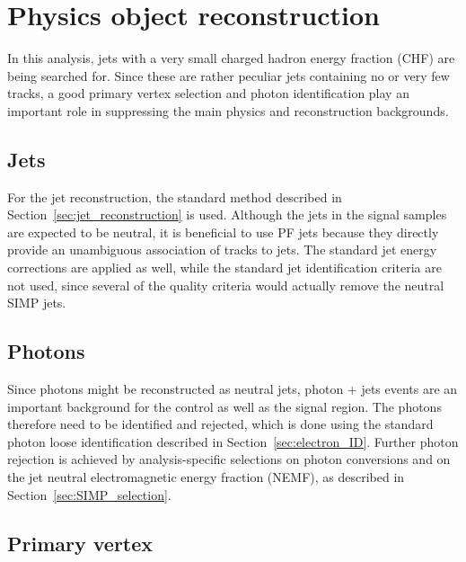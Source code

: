 \section{Physics object reconstruction} 
\label{sec:SIMP_reconstruction}

In this analysis, jets with a very small charged hadron energy fraction (CHF) are being searched for. Since these are rather peculiar jets containing no or very few tracks, a good primary vertex selection and photon identification play an important role in suppressing the main physics and reconstruction backgrounds.

\subsection{Jets}

For the jet reconstruction, the standard method described in Section~\ref{sec:jet_reconstruction} is used. Although the jets in the signal samples are expected to be neutral, it is beneficial to use \ac{PF} jets because they directly provide an unambiguous association of tracks to jets. The standard jet energy corrections are applied as well, while the standard jet identification criteria are not used, since several of the quality criteria would actually remove the neutral \ac{SIMP} jets.

\subsection{Photons}

Since photons might be reconstructed as neutral jets, photon + jets events are an important background for the control as well as the signal region. The photons therefore need to be identified and rejected, which is done using the standard photon loose identification described in Section~\ref{sec:electron_ID}. Further photon rejection is achieved by analysis-specific selections on photon conversions and on the jet neutral electromagnetic energy fraction (NEMF), as described in Section~\ref{sec:SIMP_selection}.

\subsection{Primary vertex}


